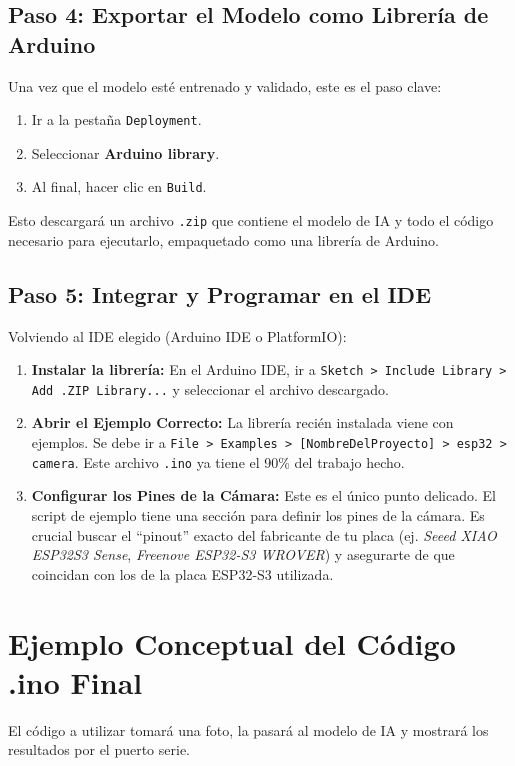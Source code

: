 \documentclass[12pt, a4paper]{article}
\begin{document}
\subsection{Paso 4: Exportar el Modelo como Librería de Arduino}
Una vez que el modelo esté entrenado y validado, este es el paso clave:
\begin{enumerate}
    \item Ir a la pestaña \texttt{Deployment}.
    \item Seleccionar \textbf{Arduino library}.
    \item Al final, hacer clic en \texttt{Build}.
\end{enumerate}
Esto descargará un archivo \texttt{.zip} que contiene el modelo de IA y todo el código necesario para ejecutarlo, empaquetado como una librería de Arduino.

\subsection{Paso 5: Integrar y Programar en el IDE}
Volviendo al IDE elegido (Arduino IDE o PlatformIO):
\begin{enumerate}
    \item \textbf{Instalar la librería:} En el Arduino IDE, ir a \texttt{Sketch > Include Library > Add .ZIP Library...} y seleccionar el archivo descargado.
    \item \textbf{Abrir el Ejemplo Correcto:} La librería recién instalada viene con ejemplos. Se debe ir a \texttt{File > Examples > [NombreDelProyecto] > esp32 > camera}. Este archivo \texttt{.ino} ya tiene el 90\% del trabajo hecho.
    \item \textbf{Configurar los Pines de la Cámara:} Este es el único punto delicado. El script de ejemplo tiene una sección para definir los pines de la cámara. Es crucial buscar el ``pinout'' exacto del fabricante de tu placa (ej. \textit{Seeed XIAO ESP32S3 Sense}, \textit{Freenove ESP32-S3 WROVER}) y asegurarte de que coincidan con los de la placa ESP32-S3 utilizada.
\end{enumerate}

\section{Ejemplo Conceptual del Código .ino Final}
El código a utilizar tomará una foto, la pasará al modelo de IA y mostrará los resultados por el puerto serie.
\end{document}
